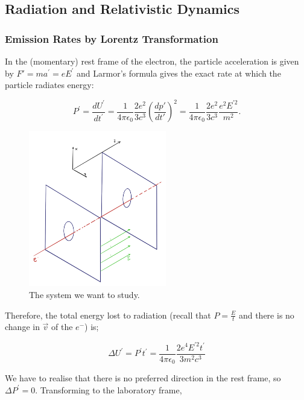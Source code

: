 \subsection{Radiation and Relativistic Dynamics}

\subsubsection{Emission Rates by Lorentz Transformation}\label{Emission Rates by Lorentz Transformation}

In the (momentary) rest frame of the electron, the particle acceleration is given by $F' = m a^{\prime}=e E^{\prime} $ and Larmor's formula gives the exact rate at which the particle radiates energy:

\begin{equation}
	P^{\prime}=\frac{d U^{\prime}}{d t^{\prime}}=\frac{1}{4 \pi \epsilon_{0}} \frac{2 e^{2}}{3 c^{3}} \left(\frac{dp'}{dt'}\right)^{2}=\frac{1}{4 \pi \epsilon_{0}} \frac{2 e^{2}}{3 c^{3}} \frac{e^{2} E^{\prime 2}}{m^{2}}.
\end{equation}

\begin{figure}[h]
	\includegraphics[width=6cm]{figures/EmissionRates.png}
	\centering
	\caption{The system we want to study.}
\end{figure}

Therefore, the total energy lost to radiation (recall that $P = \tfrac{E}{t}$ and there is no change in $\vec{v}$ of the $e^{-}$) is;

\begin{equation}
	\Delta U^{\prime}=P^{\prime} t^{\prime}=\frac{1}{4 \pi \epsilon_{0}} \frac{2 e^{4} E^{\prime 2} t^{\prime}}{3 m^{2} c^{3}}
\end{equation}

We have to realise that there is no preferred direction in the rest frame, so $\Delta P^{\prime}=0$. Transforming to the laboratory frame,

